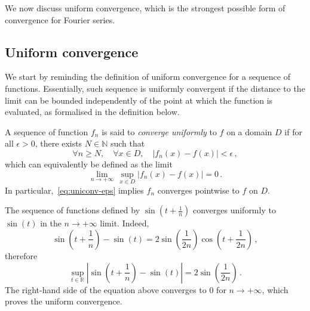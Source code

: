 We now discuss uniform convergence, which is the strongest possible form of convergence
for Fourier series.
\subsection{Uniform convergence}
We start by reminding the definition of uniform convergence for a sequence of functions.
Essentially, such sequence is uniformly convergent if the distance to the limit can be
bounded independently of the point at which the function is evaluated, as formalised in
the definition below.
\begin{definition}
  \label{def:uni-cvg}
  A sequence of function $f_n$ is said to \emph{converge uniformly} to $f$ on a domain $D$
  if for all $\epsilon>0$, there exists $N\in\mathbb{N}$ such that
  \begin{equation}
    \forall n\geq N,\quad\forall x\in D,\quad|f_n(x)-f(x)|<\epsilon\,,\label{eq:uniconv-eps}
  \end{equation}
  which can equivalently be defined as the limit
  \begin{equation}
    \lim_{n\to+\infty}\,\sup_{x\in D}|f_n(x)-f(x)|=0\,.
  \end{equation}
  In particular,~\cref{eq:uniconv-eps} implies $f_n$ converges pointwise to $f$ on $D$.
\end{definition}
\begin{example}
  The sequence of functions defined by $\sin(t+\frac{1}{n})$ converges uniformly to
  $\sin(t)$ in the $n\to+\infty$ limit. Indeed,
  \begin{equation}
    \sin\left(t+\frac{1}{n}\right)-\sin(t)
    =2\sin\left(\frac{1}{2n}\right)\cos\left(t+\frac{1}{2n}\right)\,,
  \end{equation}
  therefore
  \begin{equation}
    \sup_{t\in\mathbb{R}}\left|\sin\left(t+\frac{1}{n}\right)
    -\sin(t)\right|=2\sin\left(\frac{1}{2n}\right)\,.
  \end{equation}
  The right-hand side of the equation above converges to $0$ for $n\to+\infty$, which
  proves the uniform convergence.
\end{example}
